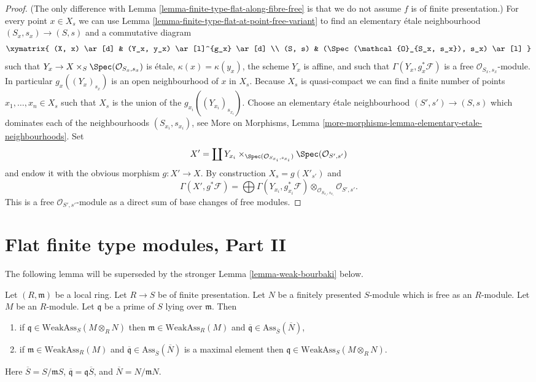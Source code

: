 \begin{proof}
(The only difference with
Lemma \ref{lemma-finite-type-flat-along-fibre-free}
is that we do not assume $f$ is of finite presentation.)
For every point $x \in X_s$ we can use
Lemma \ref{lemma-finite-type-flat-at-point-free-variant}
to find an elementary \'etale neighbourhood $(S_x , s_x) \to (S, s)$
and a commutative diagram
$$
\xymatrix{
(X, x) \ar[d] & (Y_x, y_x) \ar[l]^{g_x} \ar[d] \\
(S, s) & (\Spec(\mathcal{O}_{S_x, s_x}), s_x) \ar[l]
}
$$
such that $Y_x \to X \times_S \Spec(\mathcal{O}_{S_x, s_x})$
is \'etale, $\kappa(x) = \kappa(y_x)$, the scheme $Y_x$ is affine, and
such that $\Gamma(Y_x, g_x^*\mathcal{F})$ is a free
$\mathcal{O}_{S_x, s_x}$-module. In particular
$g_x((Y_x)_{s_x})$ is an open neighbourhood of $x$ in $X_s$.
Because $X_s$ is quasi-compact we can find a finite number of points
$x_1, \ldots, x_n \in X_s$ such that $X_s$ is the union of
the $g_{x_i}((Y_{x_i})_{s_{x_i}})$. Choose an elementary \'etale neighbourhood
$(S' , s') \to (S, s)$ which dominates each of the neighbourhoods
$(S_{x_i}, s_{x_i})$, see
More on Morphisms,
Lemma \ref{more-morphisms-lemma-elementary-etale-neighbourhoods}.
Set
$$
X' = \coprod Y_{x_i} \times_{\Spec(\mathcal{O}_{S_{x_i}, s_{x_i}})}
\Spec(\mathcal{O}_{S', s'})
$$
and endow it with the obvious morphism $g : X' \to X$.
By construction $X_s = g(X'_{s'})$ and
$$
\Gamma(X', g^*\mathcal{F})
=
\bigoplus \Gamma(Y_{x_i}, g_{x_i}^*\mathcal{F})
\otimes_{\mathcal{O}_{S_{x_i}, s_{x_i}}}
\mathcal{O}_{S', s'}.
$$
This is a free $\mathcal{O}_{S', s'}$-module as a direct sum
of base changes of free modules.
\end{proof}




\section{Flat finite type modules, Part II}
\label{section-finite-type-flat-II}

\noindent
The following lemma will be superseded by the stronger
Lemma \ref{lemma-weak-bourbaki}
below.

\begin{lemma}
\label{lemma-weak-bourbaki-pre}
Let $(R, \mathfrak m)$ be a local ring.
Let $R \to S$ be of finite presentation.
Let $N$ be a finitely presented $S$-module which is free as an $R$-module.
Let $M$ be an $R$-module.
Let $\mathfrak q$ be a prime of $S$ lying over $\mathfrak m$.
Then
\begin{enumerate}
\item if $\mathfrak q \in \text{WeakAss}_S(M \otimes_R N)$
then $\mathfrak m \in \text{WeakAss}_R(M)$ and
$\overline{\mathfrak q} \in \text{Ass}_{\overline{S}}(\overline{N})$,
\item if $\mathfrak m \in \text{WeakAss}_R(M)$ and
$\overline{\mathfrak q} \in \text{Ass}_{\overline{S}}(\overline{N})$
is a maximal element then $\mathfrak q \in \text{WeakAss}_S(M \otimes_R N)$.
\end{enumerate}
Here $\overline{S} = S/\mathfrak m S$,
$\overline{\mathfrak q} = \mathfrak q \overline{S}$, and
$\overline{N} = N/\mathfrak m N$.
\end{lemma}

